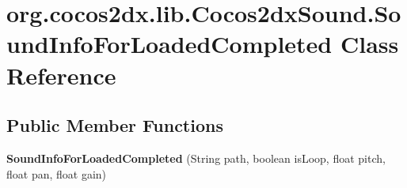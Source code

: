 \hypertarget{classorg_1_1cocos2dx_1_1lib_1_1Cocos2dxSound_1_1SoundInfoForLoadedCompleted}{}\section{org.\+cocos2dx.\+lib.\+Cocos2dx\+Sound.\+Sound\+Info\+For\+Loaded\+Completed Class Reference}
\label{classorg_1_1cocos2dx_1_1lib_1_1Cocos2dxSound_1_1SoundInfoForLoadedCompleted}
\subsection*{Public Member Functions}
\begin{DoxyCompactItemize}
\item 
\mbox{\label{classorg_1_1cocos2dx_1_1lib_1_1Cocos2dxSound_1_1SoundInfoForLoadedCompleted_a0049d40885a7e666632aa869c1c1726e}} 
{\bfseries Sound\+Info\+For\+Loaded\+Completed} (String path, boolean is\+Loop, float pitch, float pan, float gain)
\end{DoxyCompactItemize}
